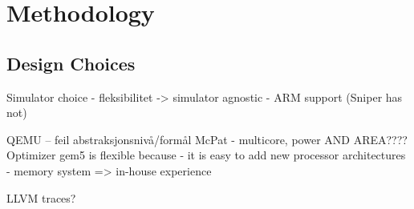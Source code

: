 \section{Methodology}

\subsection{Design Choices}
Simulator choice
- fleksibilitet -> simulator agnostic
- ARM support (Sniper has not)

QEMU -- feil abstraksjonsnivå/formål
McPat - multicore, power AND AREA???? Optimizer
gem5 is flexible because
    - it is easy to add new processor architectures
    - memory system
=> in-house experience

LLVM traces?

